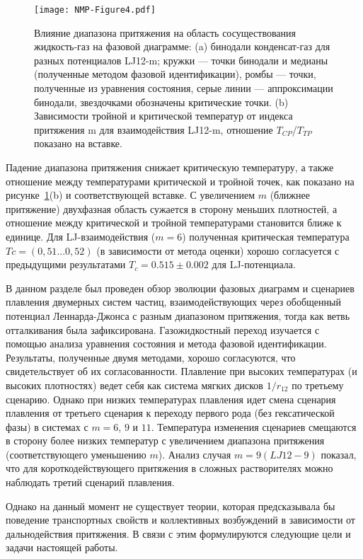 \begin{figure}[!h]
\begin{center}
\texttt{[image: NMP-Figure4.pdf]}
\caption{Влияние диапазона притяжения на область сосуществования жидкость-газ на фазовой диаграмме: (a) бинодали конденсат-газ для разных потенциалов LJ12-m; кружки — точки бинодали и медианы (полученные методом фазовой идентификации), ромбы — точки, полученные из уравнения состояния, серые линии — аппроксимации бинодали, звездочками обозначены критические точки. (b) Зависимости тройной и критической температур от индекса притяжения m для взаимодействия LJ12-m, отношение $T_{CP}$/$T_{TP}$ показано на вставке.}
\label{nmp}
\end{center}
\end{figure}

Падение диапазона притяжения снижает критическую температуру, а также отношение между температурами критической и тройной точек, как показано на рисунке~\ref{nmp}(b) и соответствующей вставке. С увеличением $m$ (ближнее притяжение) двухфазная область сужается в сторону меньших плотностей, а отношение между критической и тройной температурами становится ближе к единице. Для LJ-взаимодействия ($m = 6$) полученная критическая температура $Tc = (0,51 . . . 0,52)$ (в зависимости от метода оценки) хорошо согласуется с предыдущими результатами $T_c = 0.515 \pm 0.002$  для LJ-потенциала.

В данном разделе был проведен обзор эволюции фазовых диаграмм и сценариев плавления двумерных систем частиц, взаимодействующих через обобщенный потенциал Леннарда-Джонса с разным диапазоном притяжения, тогда как ветвь отталкивания была зафиксирована. Газожидкостный переход изучается с помощью анализа уравнения состояния и метода фазовой идентификации. Результаты, полученные двумя методами, хорошо согласуются, что свидетельствует об их согласованности. Плавление при высоких температурах (и высоких плотностях) ведет себя как система мягких дисков $1/r_{12}$ по третьему сценарию. Однако при низких температурах плавления идет смена сценария плавления от третьего сценария к переходу первого рода (без гексатической фазы) в системах с $m = 6$, $9$ и $11$. Температура изменения сценариев смещаются в сторону более низких температур с увеличением диапазона притяжения (соответствующего уменьшению $m$). Анализ случая $m = 9 (LJ12-9)$  показал, что для короткодействующего притяжения в сложных растворителях можно наблюдать третий сценарий плавления.

Однако на данный момент не существует теории, которая предсказывала бы поведение транспортных свойств и коллективных возбуждений в зависимости от дальнодействия притяжения. В связи с этим формулируются следующие цели и задачи настоящей работы.

